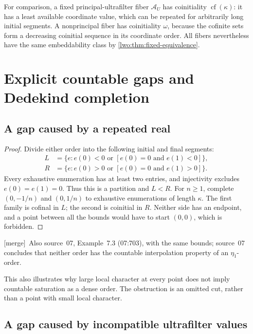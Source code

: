 \documentclass[11pt,a4paper]{article}
\newtheorem{proposition}[theorem]{Proposition}
\theoremstyle{definition}
\theoremstyle{remark}
\newcommand{\W}{\mathcal W}
\newcommand{\A}{\mathcal A}
\newcommand{\cf}{\operatorname{cf}}
\newcommand{\merge}{\textsf{[merge]}}
\begin{document}
For comparison, a fixed principal-ultrafilter fiber $\A_U$ has coinitiality
$\cf(\kappa)$: it has a least available coordinate value, which can be
repeated for arbitrarily long initial segments. A nonprincipal fiber has
coinitiality $\omega$, because the cofinite sets form a decreasing
coinitial sequence in its coordinate order. All fibers nevertheless have
the same embeddability class by \cref{lwo:thm:fixed-equivalence}.

\section{Explicit countable gaps and Dedekind completion}\label{lwo:sec:completion}

\subsection{A gap caused by a repeated real}

\begin{proof}
Divide either order into the following initial and final segments:
\begin{align*}
 L&=\{e:e(0)<0\text{ or }[e(0)=0\text{ and }e(1)<0]\},\\
 R&=\{e:e(0)>0\text{ or }[e(0)=0\text{ and }e(1)>0]\}.
\end{align*}
Every exhaustive enumeration has at least two entries, and injectivity
excludes $e(0)=e(1)=0$. Thus this is a partition and $L<R$.
For $n\geq1$, complete $(0,-1/n)$ and $(0,1/n)$ to exhaustive
enumerations of length $\kappa$. The first family is cofinal in $L$;
the second is coinitial in $R$. Neither side has an endpoint, and a point
between all the bounds would have to start $(0,0)$, which is forbidden.
\end{proof}
\merge\ Also source~07, Example~7.3 (07:703), with the same bounds;
source~07 concludes that neither order has the countable interpolation
property of an $\eta_1$-order.

This also illustrates why large local character at every point does not
imply countable saturation as a dense order. The obstruction is an omitted
cut, rather than a point with small local character.

\subsection{A gap caused by incompatible ultrafilter values}
\end{document}
